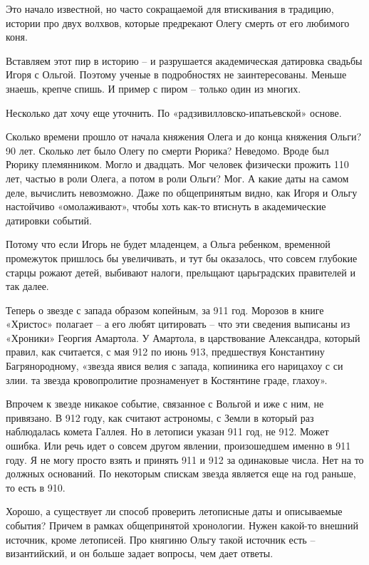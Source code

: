 Это начало известной, но часто сокращаемой для втискивания в традицию, истории про двух волхвов, которые предрекают Олегу смерть от его любимого коня.

Вставляем этот пир в историю – и разрушается академическая датировка свадьбы Игоря с Ольгой. Поэтому ученые в подробностях не заинтересованы. Меньше знаешь, крепче спишь. И пример с пиром – только один из многих.

Несколько дат хочу еще уточнить. По «радзивиллов\-ско-ипа\-тьевской» основе. 

Сколько времени прошло от начала княжения Олега и до конца княжения Ольги? 90 лет. Сколько лет было Олегу по смерти Рюрика? Неведомо. Вроде был Рюрику племянником. Могло и двадцать. Мог человек физически прожить 110 лет, частью в роли Олега, а потом в роли Ольги? Мог. А какие даты на самом деле, вычислить невозможно. Даже по общепринятым видно, как Игоря и Ольгу настойчиво «омолаживают», чтобы хоть как-то втиснуть в академические датировки событий. 

Потому что если Игорь не будет младенцем, а Ольга ребенком, временной промежуток пришлось бы увеличивать, и тут бы оказалось, что совсем глубокие старцы рожают детей, выбивают налоги, прельщают царьградских правителей и так далее.

Теперь о звезде с запада образом копейным, за 911 год. Морозов в книге «Христос» полагает – а его любят цитировать – что эти сведения выписаны из «Хроники» Георгия Амартола. У Амартола, в царствование Александра, который правил, как считается, с мая 912 по июнь 913, предшествуя Константину Багрянородному, «звезда явися велия с запада, копииника его нарицахоу с си злии. та звезда кровопролитие прознаменует в Костянтине граде, глахоу».

Впрочем к звезде никакое событие, связанное с Вольгой и иже с ним, не привязано. В 912 году, как считают астрономы, с Земли в который раз наблюдалась комета Галлея. Но в летописи указан 911 год, не 912. Может ошибка. Или речь идет о совсем другом явлении, произошедшем именно в 911 году. Я не могу просто взять и принять 911 и 912 за одинаковые числа. Нет на то должных оснований. По некоторым спискам звезда является еще на год раньше, то есть в 910.

Хорошо, а существует ли способ проверить летописные даты и описываемые события? Причем в рамках общепринятой хронологии. Нужен какой-то внешний источник, кроме летописей. Про княгиню Ольгу такой источник есть – византийский, и он больше задает вопросы, чем дает ответы.

